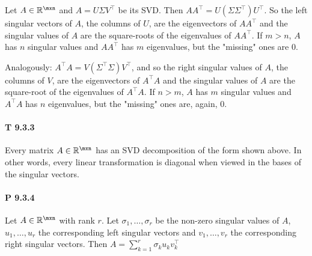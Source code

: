 Let $A\in\mathbb{R}^{\mxn}$ and $A=U\Sigma V^\top$ be its SVD.
Then $AA^\top = U(\Sigma\Sigma^\top)U^\top$. So the left singular vectors
of $A$, the columns of $U$, are the eigenvectors of $AA^\top$ and the
singular values of $A$ are the square-roots of the eigenvalues of $AA^\top$.
If $m>n$, $A$ has $n$ singular values and $AA^\top$ has $m$ eigenvalues,
but the "missing" ones are $0$.

Analogously: $A^\top A=V(\Sigma^\top\Sigma)V^\top$, and so the right singular
values of $A$, the columns of $V$, are the eigenvectors of $A^\top A$ and the
singular values of $A$ are the square-root of the eigenvalues of $A^\top A$.
If $n>m$, $A$ has $m$ singular values and $A^\top A$ has $n$ eigenvalues, but
the "missing" ones are, again, $0$.

\paragraph{T 9.3.3} Every matrix $A\in\mathbb{R}^{\mxn}$ has an SVD
decomposition of the form shown above. In other words, every linear transformation
is diagonal when viewed in the bases of the singular vectors.

\paragraph{P 9.3.4} Let $A \in \mathbb{R}^{\mxn}$ with rank $r$.
Let $\sigma_1, \dots, \sigma_r$ be the non-zero singular values of $A$,
$u_1, \dots, u_r$ the corresponding left singular vectors and $v_1, \dots, v_r$
the corresponding right singular vectors.
Then $A =  \sum_{k=1}^{r}\sigma_k u_k v_k^\top$
